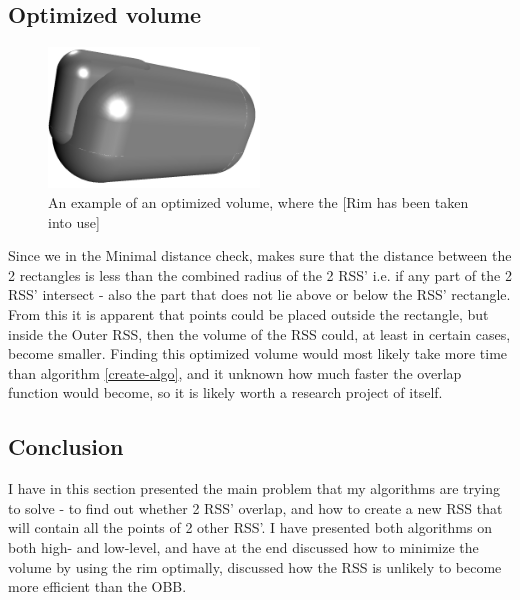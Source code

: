 \subsection{Optimized volume} 
\begin{figure}
\centering
\includegraphics[width=0.5\textwidth]{figures/normalInter}
\caption{\label{optimized-volume}An example of an optimized volume, where the [Rim has been taken into use]}
\end{figure}

Since we in the Minimal distance check, makes sure that the distance between the 2 rectangles is less than the combined radius of the 2 RSS' i.e. if any part of the 2 RSS' intersect - also the part that does not lie above or below the RSS' rectangle. From this it is apparent that points could be placed outside the rectangle, but inside the Outer RSS, then the volume of the RSS could, at least in certain cases, become smaller. Finding this optimized volume would most likely take more time than algorithm \ref{create-algo}, and it unknown how much faster the overlap function would become, so it is likely worth a research project of itself. 

\subsection{Conclusion}
I have in this section presented the main problem that my algorithms are trying to solve - to find out whether 2 RSS' overlap, and how to create a new RSS that will contain all the points of 2 other RSS'. I have presented both algorithms on both high- and low-level, and have at the end discussed how to minimize the volume by using the rim optimally, discussed how the RSS is unlikely to become more efficient than the OBB.
